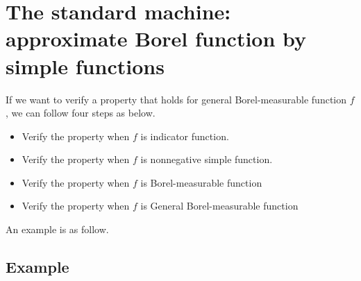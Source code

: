 \section{The standard machine: approximate Borel function by simple functions}

If we want to verify a property that holds for general Borel-measurable function $f$, we can follow four steps as below.

\begin{itemize}
	\item Verify the property when $f$ is indicator function.
	\item Verify the property when $f$ is nonnegative simple function.
	\item Verify the property when $f$ is Borel-measurable function
	\item Verify the property when $f$ is General Borel-measurable function
\end{itemize}

An example is as follow.

\subsection{Example}

